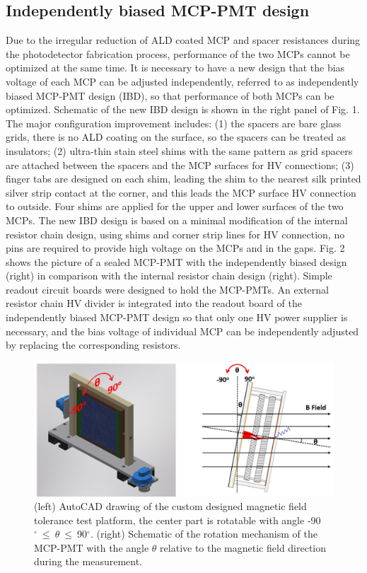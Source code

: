 \documentclass[preprint,5p]{elsarticle}
\begin{document}
\subsection{Independently biased MCP-PMT design} \label{sec_design}
Due to the irregular reduction of ALD coated MCP and spacer resistances during 
the photodetector fabrication process, performance of the two MCPs cannot be 
optimized at the same time. It is necessary to have a new design that the bias 
voltage of each MCP can be adjusted independently, referred to as independently 
biased MCP-PMT design (IBD), so that performance of both MCPs can be optimized.  
Schematic of the new IBD design is shown in the right panel of Fig. 1. The 
major configuration improvement includes: (1) the spacers are bare glass grids, 
there is no ALD coating on the surface, so the spacers can be treated as 
insulators; (2) ultra-thin stain steel shims with the same pattern as grid 
spacers are attached between the spacers and the MCP surfaces for HV 
connections; (3) finger tabs are designed on each shim, leading the shim to the 
nearest silk printed silver strip contact at the corner, and this leads the MCP 
surface HV connection to outside. Four shims are applied for the upper and 
lower surfaces of the two MCPs. The new IBD design is based on a minimal 
modification of the internal resistor chain design, using shims and corner 
strip lines for HV connection, no pins are required to provide high voltage on 
the MCPs and in the gaps. Fig. 2 shows the picture of a sealed MCP-PMT with the 
independently biased design (right) in comparison with the internal resistor 
chain design (right). Simple readout circuit boards were designed to hold the 
MCP-PMTs. An external resistor chain HV divider is integrated into the readout 
board of the independently biased MCP-PMT design so that only one HV power 
supplier is necessary, and the bias voltage of individual MCP can be 
independently adjusted by replacing the corresponding resistors. 

\begin{figure}[tbp]
\centering \includegraphics[scale=0.5]{fig/tMkmiI.jpg}
\caption{(left) AutoCAD drawing of the custom designed magnetic field tolerance 
   test platform, the center part is rotatable with angle 
   -90$^{\circ}~\leq~\theta~\leq~$90$^{\circ}$.  (right) Schematic of the 
   rotation mechanism of the MCP-PMT with the angle $\theta$ relative to the 
   magnetic field direction during the measurement. } \label{fig:design}
\end{figure}
\end{document}

